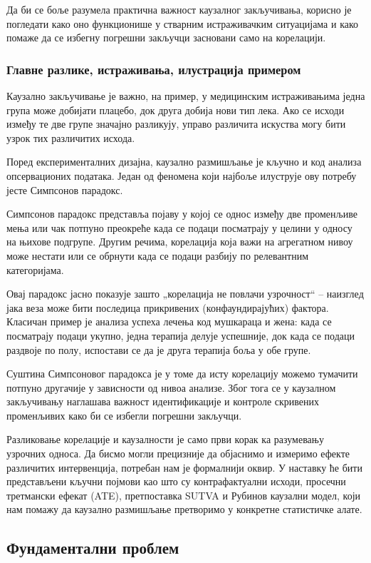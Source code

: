 \documentclass[12pt, a4paper]{article}
\begin{document}
Да би се боље разумела практична важност каузалног закључивања, корисно је погледати како оно функционише у стварним истраживачким ситуацијама и како помаже да се 
избегну погрешни закључци засновани само на корелацији.

\subsubsection{Главне разлике, истраживања, илустрација примером}
Каузално закључивање је важно, на пример, у медицинским истраживањима једна група може добијати плацебо, док друга добија нови тип лека.
Ако се исходи између те две групе значајно разликују, управо различита искуства могу бити узрок тих различитих исхода.

Поред експерименталних дизајна, каузално размишљање је кључно и код анализа опсервационих података. Један од феномена који најбоље илуструје ову потребу јесте 
Симпсонов парадокс.

Симпсонов парадокс представља појаву у којој се однос између две променљиве мења или чак потпуно преокреће када се подаци 
посматрају у целини у односу на њихове подгрупе. Другим речима, корелација која важи на агрегатном нивоу може нестати или 
се обрнути када се подаци разбију по релевантним категоријама.

Овај парадокс јасно показује зашто „корелација не повлачи узрочност“ – наизглед јака веза може бити последица прикривених 
(конфаундирајућих) фактора. %
Класичан пример је анализа успеха лечења код мушкараца и жена: када се посматрају подаци укупно, 
једна терапија делује успешније, док када се подаци раздвоје по полу, испостави се да је друга терапија боља у обе групе.

Суштина Симпсоновог парадокса је у томе да исту корелацију можемо тумачити потпуно другачије у зависности од нивоа анализе. 
Због тога се у каузалном закључивању наглашава важност идентификације и контроле скривених променљивих како би се избегли 
погрешни закључци.

Разликовање корелације и каузалности је само први корак ка разумевању узрочних односа. Да бисмо могли прецизније да објаснимо и измеримо ефекте различитих интервенција, 
потребан нам је формалнији оквир. У наставку ће бити представљени кључни појмови као што су контрафактуални исходи, просечни третмански ефекат (ATE), претпоставка 
SUTVA и Рубинов каузални модел, који нам помажу да каузално размишљање претворимо у конкретне статистичке алате.


\subsection{Фундаментални проблем}
\end{document}
